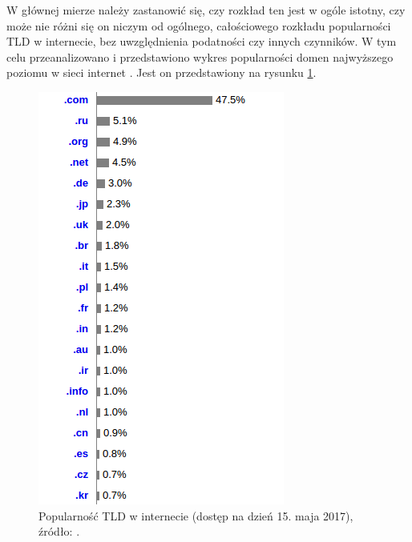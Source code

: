 W głównej mierze należy zastanowić się, czy rozkład ten jest w ogóle istotny, czy może nie różni się on niczym od ogólnego,
całościowego rozkładu popularności TLD w internecie, bez uwzględnienia podatności czy innych czynników. W tym celu przeanalizowano
i przedstawiono wykres popularności domen najwyższego poziomu w sieci internet \cite{TLD_popularity}. Jest on przedstawiony na
rysunku \ref{fig:TLD_all}.
\begin{center}
	\begin{figure}
		\centering
		\includegraphics[scale=0.75]{image/TLD_all}
		\caption{Popularność TLD w internecie (dostęp na dzień 15. maja 2017), źródło:  \cite{TLD_popularity}.}
		\label{fig:TLD_all}
	\end{figure}
\end{center}

